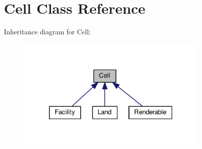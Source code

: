 \hypertarget{classCell}{}\section{Cell Class Reference}
\label{classCell}


Inheritance diagram for Cell\+:
\nopagebreak
\begin{figure}[H]
\begin{center}
\leavevmode
\includegraphics[width=268pt]{classCell__inherit__graph}
\end{center}
\end{figure}
